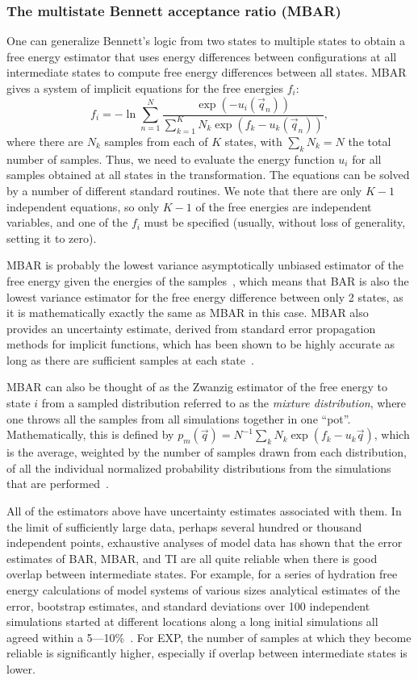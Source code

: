 \documentclass[9pt,bestpractices]{livecoms}
\begin{document}
\subsubsection{The multistate Bennett acceptance ratio (MBAR)}
One can generalize Bennett's logic from two states to multiple states to obtain a free energy estimator that uses energy differences between configurations at all intermediate states to compute free energy differences between all states. MBAR gives a system of implicit equations for the free energies $f_i$:
\begin{equation}
f_i = - \ln \sum_{n=1}^{N} \frac{\exp(-u_i(\vec{q}_n))}{\sum_{k=1}^K N_k \exp(f_k-u_k(\vec{q}_n))},
\end{equation}
where there are $N_k$ samples from each of $K$ states, with $\sum_k N_k=N$ the total number of samples. Thus, we need to evaluate the energy function $u_i$ for all samples obtained at all states in the transformation. The equations can be solved by a number of different standard routines. We note that there are only $K-1$ independent equations, so only $K-1$ of the free energies are independent variables, and one of the $f_i$ must be specified (usually, without loss of generality, setting it to zero).

MBAR is probably the lowest variance asymptotically unbiased estimator of the free energy given the energies of the samples~\cite{tan2004likelihood}, which means that BAR is also the lowest variance estimator for the free energy difference between only 2 states, as it is mathematically exactly the same as MBAR in this case. MBAR also provides an uncertainty estimate, derived from standard error propagation methods for implicit functions, which has been shown to be highly accurate as long as there are sufficient samples at each state~\cite{paliwal2011benchmark}.

MBAR can also be thought of as the Zwanzig estimator of the free energy to state $i$ from a sampled distribution referred to as the \textit{mixture distribution}, where one throws all the samples from all simulations together in one ``pot''. Mathematically, this is defined by $p_m(\vec{q}) = N^{-1} \sum_k N_k \exp(f_k-u_k\vec{q})$, which is the average, weighted by the number of samples drawn from each distribution, of all the individual normalized probability distributions from the simulations that are performed~\cite{shirts2017reweighting}.

All of the estimators above have uncertainty estimates associated with them.  In the limit of sufficiently large data, perhaps several hundred or thousand independent points, exhaustive analyses of model data has shown that the error estimates of BAR, MBAR, and TI are all quite reliable when there is good overlap between intermediate states. For example, for a series of hydration free energy calculations of model systems of various sizes analytical estimates of the error, bootstrap estimates, and standard deviations over 100 independent simulations started at different locations along a long initial simulations all agreed within a 5---10\%~\cite{paliwal2011benchmark}. For EXP, the number of samples at which they become reliable is significantly higher, especially if overlap between intermediate states is lower. 
\end{document}
